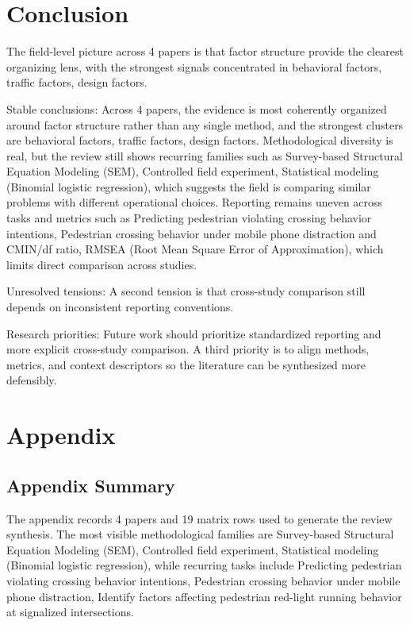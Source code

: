 \documentclass{article}
\begin{document}
\section{Conclusion}
The field-level picture across 4 papers is that factor structure provide the clearest organizing lens, with the strongest signals concentrated in behavioral factors, traffic factors, design factors. \cite{08_2016_zhou_aap,09_2018_jiang_aap}

Stable conclusions: Across 4 papers, the evidence is most coherently organized around factor structure rather than any single method, and the strongest clusters are behavioral factors, traffic factors, design factors. Methodological diversity is real, but the review still shows recurring families such as Survey-based Structural Equation Modeling (SEM), Controlled field experiment, Statistical modeling (Binomial logistic regression), which suggests the field is comparing similar problems with different operational choices. Reporting remains uneven across tasks and metrics such as Predicting pedestrian violating crossing behavior intentions, Pedestrian crossing behavior under mobile phone distraction and CMIN/df ratio, RMSEA (Root Mean Square Error of Approximation), which limits direct comparison across studies. \cite{08_2016_zhou_aap,09_2018_jiang_aap}

Unresolved tensions: A second tension is that cross-study comparison still depends on inconsistent reporting conventions. \cite{08_2016_zhou_aap,09_2018_jiang_aap}

Research priorities: Future work should prioritize standardized reporting and more explicit cross-study comparison. A third priority is to align methods, metrics, and context descriptors so the literature can be synthesized more defensibly. \cite{08_2016_zhou_aap,09_2018_jiang_aap}

\appendix
\section{Appendix}
\subsection{Appendix Summary}
\noindent The appendix records 4 papers and 19 matrix rows used to generate the review synthesis. The most visible methodological families are Survey-based Structural Equation Modeling (SEM), Controlled field experiment, Statistical modeling (Binomial logistic regression), while recurring tasks include Predicting pedestrian violating crossing behavior intentions, Pedestrian crossing behavior under mobile phone distraction, Identify factors affecting pedestrian red-light running behavior at signalized intersections.
\end{document}
